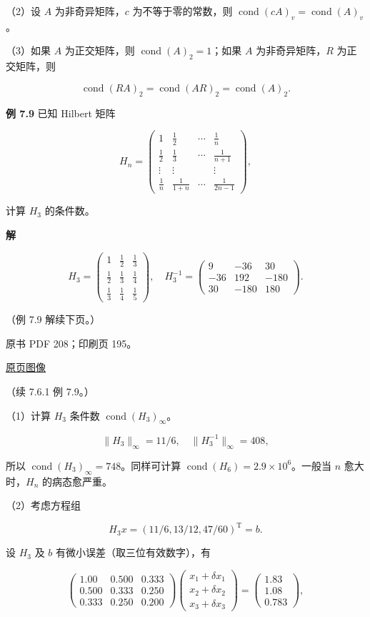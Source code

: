 \documentclass[
  10pt,
  fontset=fandol]{ctexart}
\begin{document}
（2）设 \(A\) 为非奇异矩阵，\(c\) 为不等于零的常数，则
\(\operatorname{cond}(cA)_v=\operatorname{cond}(A)_v\)。

（3）如果 \(A\) 为正交矩阵，则 \(\operatorname{cond}(A)_2=1\)；如果
\(A\) 为非奇异矩阵，\(R\) 为正交矩阵，则

\[
\operatorname{cond}(RA)_2=\operatorname{cond}(AR)_2=\operatorname{cond}(A)_2.
\]

\textbf{例 7.9} 已知 Hilbert 矩阵

\[
H_n=\begin{pmatrix}
1&\frac12&\cdots&\frac1n\\[4pt]
\frac12&\frac13&\cdots&\frac1{n+1}\\
\vdots&\vdots&&\vdots\\
\frac1n&\frac1{1+n}&\cdots&\frac1{2n-1}
\end{pmatrix},
\]

计算 \(H_3\) 的条件数。

\textbf{解}

\[
H_3=\begin{pmatrix}
1&\frac12&\frac13\\[4pt]
\frac12&\frac13&\frac14\\[4pt]
\frac13&\frac14&\frac15
\end{pmatrix},\quad
H_3^{-1}=\begin{pmatrix}
9&-36&30\\
-36&192&-180\\
30&-180&180
\end{pmatrix}.
\]

（例 7.9 解续下页。）

\clearpage

原书 PDF 208；印刷页 195。

\href{../../../source-images/pdf-208.jpeg}{原页图像}

（续 7.6.1 例 7.9。）

（1）计算 \(H_3\) 条件数 \(\operatorname{cond}(H_3)_\infty\)。

\[
\|H_3\|_\infty=11/6,\quad\|H_3^{-1}\|_\infty=408,
\]

所以 \(\operatorname{cond}(H_3)_\infty=748\)。同样可计算
\(\operatorname{cond}(H_6)=2.9\times10^6\)。一般当 \(n\) 愈大时，\(H_n\)
的病态愈严重。

（2）考虑方程组

\[
H_3x=(11/6,13/12,47/60)^{\mathrm T}=b.
\]

设 \(H_3\) 及 \(b\) 有微小误差（取三位有效数字），有

\[
\begin{pmatrix}
1.00&0.500&0.333\\
0.500&0.333&0.250\\
0.333&0.250&0.200
\end{pmatrix}
\begin{pmatrix}x_1+\delta x_1\\x_2+\delta x_2\\x_3+\delta x_3\end{pmatrix}
=\begin{pmatrix}1.83\\1.08\\0.783\end{pmatrix},
\tag{7.6.8}
\]
\end{document}
